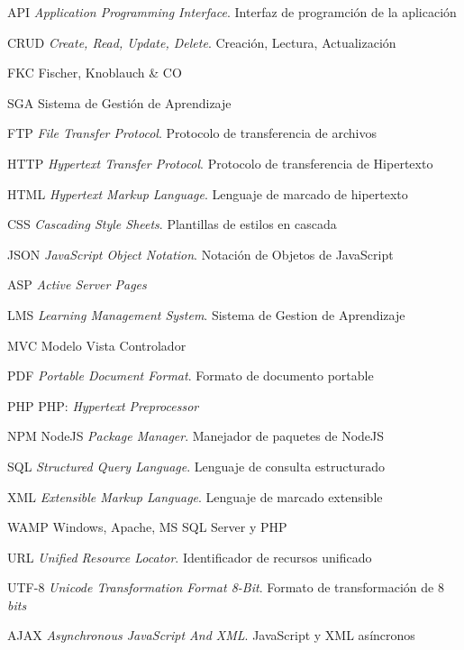 	{API}
	{\emph{Application Programming Interface}. Interfaz de programción de la aplicación}

	{CRUD}
	{\emph{Create, Read, Update, Delete}. Creación, Lectura, Actualización}

	{FKC}
	{Fischer, Knoblauch \& CO}

	{SGA}
	{Sistema de Gestión de Aprendizaje}

	{FTP}
	{\emph{File Transfer Protocol}. Protocolo de transferencia de archivos}

	{HTTP}
	{\emph{Hypertext Transfer Protocol}. Protocolo de transferencia de Hipertexto}

	{HTML}
	{\emph{Hypertext Markup Language}. Lenguaje de marcado de hipertexto}

	{CSS}
	{\emph{Cascading Style Sheets}. Plantillas de estilos en cascada}

	{JSON}
	{\emph{JavaScript Object Notation}. Notación de Objetos de JavaScript}

	{ASP}
	{\emph{Active Server Pages}}

	{LMS}
	{\emph{Learning Management System}. Sistema de Gestion de Aprendizaje}

	{MVC}
	{Modelo Vista Controlador}

	{PDF}
	{\emph{Portable Document Format}. Formato de documento portable}

	{PHP}
	{PHP: \emph{Hypertext Preprocessor}}

	{NPM}
	{NodeJS \emph{Package Manager}. Manejador de paquetes de NodeJS}

	{SQL}
	{\emph{Structured Query Language}. Lenguaje de consulta estructurado}

	{XML}
	{\emph{Extensible Markup Language}. Lenguaje de marcado extensible}

	{WAMP}
	{Windows, Apache, MS SQL Server y PHP}

	{URL}
	{\emph{Unified Resource Locator}. Identificador de recursos unificado}

	{UTF-8}
	{\emph{Unicode Transformation Format 8-Bit}. Formato de transformación de 8 \emph{bits}}

	{AJAX}
	{\emph{Asynchronous JavaScript And XML}. JavaScript y XML asíncronos}

